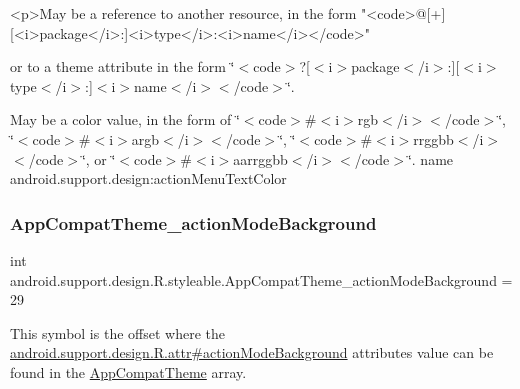 \begin{DoxyVerb}      <p>May be a reference to another resource, in the form "<code>@[+][<i>package</i>:]<i>type</i>:<i>name</i></code>"
\end{DoxyVerb}
 or to a theme attribute in the form \char`\"{}$<$code$>$?\mbox{[}$<$i$>$package$<$/i$>$\+:\mbox{]}\mbox{[}$<$i$>$type$<$/i$>$\+:\mbox{]}$<$i$>$name$<$/i$>$$<$/code$>$\char`\"{}. 

May be a color value, in the form of \char`\"{}$<$code$>$\#$<$i$>$rgb$<$/i$>$$<$/code$>$\char`\"{}, \char`\"{}$<$code$>$\#$<$i$>$argb$<$/i$>$$<$/code$>$\char`\"{}, \char`\"{}$<$code$>$\#$<$i$>$rrggbb$<$/i$>$$<$/code$>$\char`\"{}, or \char`\"{}$<$code$>$\#$<$i$>$aarrggbb$<$/i$>$$<$/code$>$\char`\"{}.  name android.\+support.\+design\+:action\+Menu\+Text\+Color \mbox{\label{classandroid_1_1support_1_1design_1_1R_1_1styleable_a558b51abb51bf7789c77678e8251a2e1}} 
\subsubsection{\texorpdfstring{App\+Compat\+Theme\+\_\+action\+Mode\+Background}{AppCompatTheme\_actionModeBackground}}
{\footnotesize\ttfamily int android.\+support.\+design.\+R.\+styleable.\+App\+Compat\+Theme\+\_\+action\+Mode\+Background = 29\hspace{0.3cm}{\ttfamily [static]}}

This symbol is the offset where the \hyperlink{classandroid_1_1support_1_1design_1_1R_1_1attr_a25ba85cbbc94b7b1a638506bcd7914df}{android.\+support.\+design.\+R.\+attr\#action\+Mode\+Background} attribute\textquotesingle{}s value can be found in the \hyperlink{classandroid_1_1support_1_1design_1_1R_1_1styleable_afb351dc8de20cbd4c89abe360373010c}{App\+Compat\+Theme} array.

